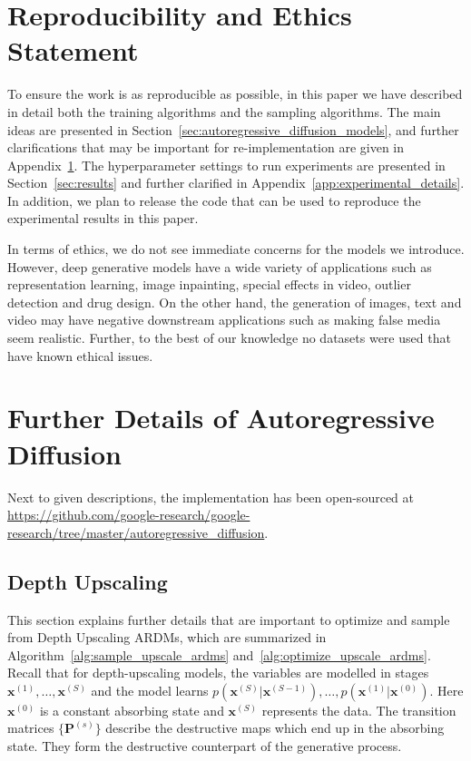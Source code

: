 \documentclass{article} \usepackage{iclr2022_conference,times}
\def\vx{{\bm{x}}}
\begin{document}
\section*{Reproducibility and Ethics Statement}
To ensure the work is as reproducible as possible, in this paper we have described in detail both the training algorithms and the sampling algorithms. The main ideas are presented in Section~\ref{sec:autoregressive_diffusion_models}, and further clarifications that may be important for re-implementation are given in Appendix~\ref{app:details_ardm}. The hyperparameter settings to run experiments are presented in Section~\ref{sec:results} and further clarified in Appendix~\ref{app:experimental_details}. In addition, we plan to release the code that can be used to reproduce the experimental results in this paper.

In terms of ethics, we do not see immediate concerns for the models we introduce. However, deep generative models have a wide variety of applications such as representation learning, image inpainting, special effects in video, outlier detection and drug design. On the other hand, the generation of images, text and video may have negative downstream applications such as making false media seem realistic. Further, to the best of our knowledge no datasets were used that have known ethical issues.








\newpage
\appendix

\newpage
\section{Further Details of Autoregressive Diffusion}
\label{app:details_ardm}

Next to given descriptions, the implementation has been open-sourced at \url{https://github.com/google-research/google-research/tree/master/autoregressive_diffusion}.


\subsection{Depth Upscaling}
This section explains further details that are important to optimize and sample from Depth Upscaling ARDMs, which are summarized in Algorithm~\ref{alg:sample_upscale_ardms} and~\ref{alg:optimize_upscale_ardms}. Recall that for depth-upscaling models, the variables are modelled in stages $\vx^{(1)}, \ldots, \vx^{(S)}$ and the model learns $p(\vx^{(S)}|\vx^{(S-1)}), \ldots, p(\vx^{(1)} | \vx^{(0)})$. Here $\vx^{(0)}$ is a constant absorbing state and $\vx^{(S)}$ represents the data. The transition matrices $\{\mathbf{P}^{(s)}\}$ describe the destructive maps which end up in the absorbing state. They form the destructive counterpart of the generative process.
\end{document}
